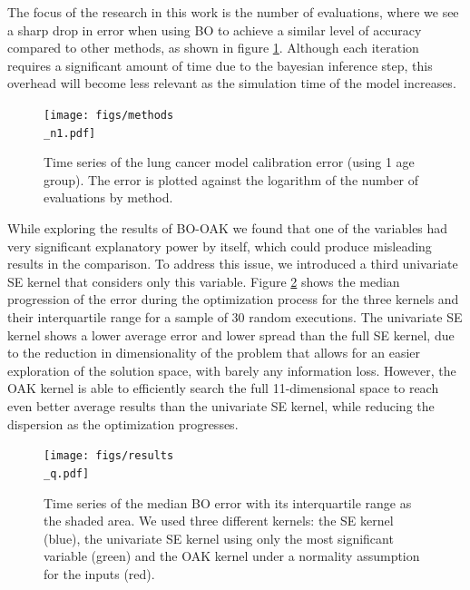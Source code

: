 \documentclass{IOS-Book-Article}
\begin{document}
The focus of the research in this work is the number of evaluations, where we see a sharp drop in error when using BO to achieve a similar level of accuracy compared to other methods, as shown in figure \ref{fig:method_comparison}. Although each iteration requires a significant amount of time due to the bayesian inference step, this overhead will become less relevant as the simulation time of the model increases.
	
	\begin{figure}[h!]
		\centering	
		\texttt{[image: figs/methods\\\_n1.pdf]}		
		\caption{Time series of the lung cancer model calibration error (using 1 age group). The error is plotted against the logarithm of the number of evaluations by method.}
		\label{fig:method_comparison}	
	\end{figure}
	
While exploring the results of BO-OAK we found that one of the variables had very significant explanatory power by itself, which could produce misleading results in the comparison. To address this issue, we introduced a third univariate SE kernel that considers only this variable. Figure \ref{fig:results_oak} shows the median progression of the error during the optimization process for the three kernels and their interquartile range for a sample of 30 random executions. The univariate SE kernel shows a lower average error and lower spread than the full SE kernel, due to the reduction in dimensionality of the problem that allows for an easier exploration of the solution space, with barely any information loss. However, the OAK kernel is able to efficiently search the full 11-dimensional space to reach even better average results than the univariate SE kernel, while reducing the dispersion as the optimization progresses.
	
	\begin{figure}[h!]
		\centering	
		\texttt{[image: figs/results\\\_q.pdf]}		
		\caption{Time series of the median BO error with its interquartile range as the shaded area. We used three different kernels: the SE kernel (blue), the univariate SE kernel using only the most significant variable (green) and the OAK kernel under a normality assumption for the inputs (red).}
		\label{fig:results_oak}	
	\end{figure}

	
\end{document}
